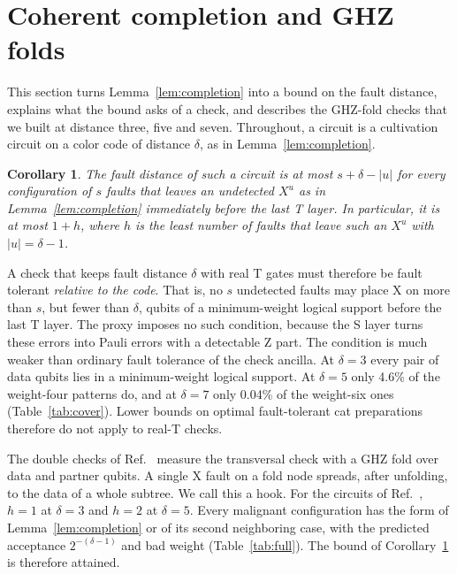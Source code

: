\documentclass[aps,prl,reprint,twocolumn,amsmath,amssymb,floatfix,nofootinbib,superscriptaddress]{revtex4-2}
\newtheorem{corollary}[theorem]{Corollary}
\theoremstyle{definition}
\theoremstyle{remark}
\begin{document}
\section{Coherent completion and GHZ folds}\label{sm:mechanism}
This section turns Lemma~\ref{lem:completion} into a bound on the fault distance, explains what the bound asks of a check, and describes the GHZ-fold checks that we built at distance three, five and seven. Throughout, a circuit is a cultivation circuit on a color code of distance $\delta$, as in Lemma~\ref{lem:completion}.
\begin{corollary}\label{cor:hooks}
The fault distance of such a circuit is at most $s+\delta-|u|$ for every configuration of $s$ faults that leaves an undetected $X^u$ as in Lemma~\ref{lem:completion} immediately before the last T layer. In particular, it is at most $1+h$, where $h$ is the least number of faults that leave such an $X^u$ with $|u|=\delta-1$.
\end{corollary}
A check that keeps fault distance $\delta$ with real T gates must therefore be fault tolerant \emph{relative to the code}. That is, no $s$ undetected faults may place X on more than $s$, but fewer than $\delta$, qubits of a minimum-weight logical support before the last T layer. The proxy imposes no such condition, because the S layer turns these errors into Pauli errors with a detectable Z part. The condition is much weaker than ordinary fault tolerance of the check ancilla. At $\delta=3$ every pair of data qubits lies in a minimum-weight logical support. At $\delta=5$ only 4.6\% of the weight-four patterns do, and at $\delta=7$ only 0.04\% of the weight-six ones (Table~\ref{tab:cover}). Lower bounds on optimal fault-tolerant cat preparations~\cite{spidercat} therefore do not apply to real-T checks.

The double checks of Ref.~\cite{cultivation} measure the transversal check with a GHZ fold over data and partner qubits. A single X fault on a fold node spreads, after unfolding, to the data of a whole subtree. We call this a hook. For the circuits of Ref.~\cite{cultivation}, $h=1$ at $\delta=3$ and $h=2$ at $\delta=5$. Every malignant configuration has the form of Lemma~\ref{lem:completion} or of its second neighboring case, with the predicted acceptance $2^{-(\delta-1)}$ and bad weight (Table~\ref{tab:full}). The bound of Corollary~\ref{cor:hooks} is therefore attained.
\end{document}
